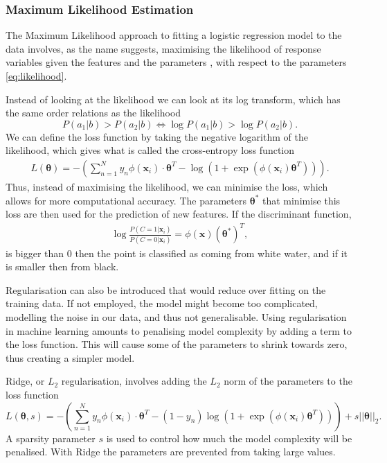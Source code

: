 \subsubsection{Maximum Likelihood Estimation}

The Maximum Likelihood approach to fitting a logistic regression model to the data involves, as the name suggests, maximising the likelihood of response variables given the features and the parameters , with respect to the parameters \eqref{eq:likelihood}.

Instead of looking at the likelihood we can look at its log transform, which has the same order relations as the likelihood
\begin{equation}
	P(a_1|b) > P(a_2|b) \Leftrightarrow 	\log P(a_1|b) >\log P(a_2|b).
\end{equation} 
We can define the loss function by taking the negative logarithm of the likelihood, which gives what is called the cross-entropy loss function
\begin{align}
	L(\bm{\theta})= - \left(\sum_{n=1}^N y_n \phi\left(\mathbf{x}_{i}\right)\cdot\bm{\theta}^{T} -\log\left(1+\exp\left(\phi\left(\mathbf{x}_{i}\right)\bm{\theta}^{T}\right)\right) \right).
\end{align}
Thus, instead of maximising the likelihood, we can minimise the loss, which allows for more computational accuracy.  
The parameters $\bm{\theta}^*$ that minimise this loss are then used for the prediction of new features. If the discriminant function,
\begin{align}
	 \log \frac{P(C=1 |  \mathbf{x}_i)}{P(C = 0 |  \mathbf{x}_i)} = \phi( \mathbf{x}) (\bm{\theta}^*)^T,
\end{align}
 is bigger than 0 then the point is classified as coming from white water, and if it is smaller then from black. 
 
 Regularisation can also be introduced that would reduce over fitting on the training data. If not employed, the model might become too complicated, modelling the noise in our data, and thus not generalisable. Using regularisation in machine learning amounts to penalising model complexity by adding a term to the loss function. This will cause some of the parameters to shrink towards zero, thus creating a simpler model.
 
 Ridge, or $L_2$ regularisation, involves adding the $L_2$ norm of the parameters to the loss function
 \begin{equation}
 		L(\bm{\theta},s)= - \left(\sum_{n=1}^N y_n \phi\left(\mathbf{x}_{i}\right)\cdot\bm{\theta}^{T} -\left(1-y_n\right)\log\left(1+\exp\left(\phi\left(\mathbf{x}_{i}\right)\bm{\theta}^{T}\right)\right) \right) + s||\bm{\theta}||_2.
 \end{equation}
  A sparsity parameter $s$ is used to control how much the model complexity will be penalised. With Ridge the parameters are prevented from taking large values.
  
